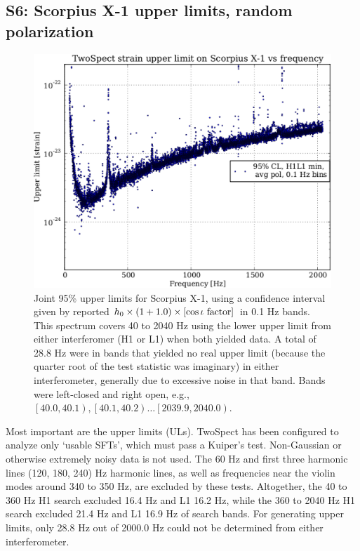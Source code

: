 \subsection{S6: Scorpius X-1 upper limits, random polarization}


\begin{figure}
\begin{center}
\includegraphics[width=0.68\paperwidth,height=0.48\paperheight]{plots/ScoX1ULs.eps}
\caption{
Joint 95\% upper limits for Scorpius X-1, using a confidence interval given by reported $h_0 \times \left( 1 + 1.0 \right) \times \left[\cos\iota \textup{ factor}\right]$ in 0.1 Hz bands. 
This spectrum covers 40 to 2040 Hz using the lower upper limit from either interferomer (H1 or L1) when both yielded data. 
A total of 28.8 Hz were in bands that yielded no real upper limit (because the quarter root of the test statistic was imaginary) in either interferometer, generally due to excessive noise in that band.
Bands were left-closed and right open, e.g., $\left[ 40.0,40.1\right), \left[ 40.1,40.2\right)\ldots \left[2039.9,2040.0\right)$.
}
\label{S6_H1L1_UL}
\end{center}
\end{figure}

Most important are the upper limits (ULs).
TwoSpect has been configured to analyze only `usable SFTs', which must pass a Kuiper's test.
Non-Gaussian or otherwise extremely noisy data is not used.
The 60 Hz and first three harmonic lines (120, 180, 240) Hz harmonic lines, as well as frequencies near the violin modes around 340 to 350 Hz, are excluded by these tests.
Altogether, the 40 to 360 Hz H1 search excluded 16.4 Hz and L1 16.2 Hz, while the 360 to 2040 Hz H1 search excluded 21.4 Hz and L1 16.9 Hz of search bands.
For generating upper limits, only 28.8 Hz out of 2000.0 Hz could not be determined from either interferometer.

